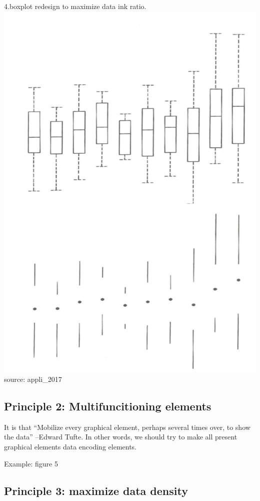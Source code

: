 \documentclass[]{book}
\theoremstyle{definition}
\theoremstyle{definition}
\theoremstyle{definition}
\theoremstyle{remark}
\begin{document}
4.boxplot redesign to maximize data ink ratio.
\includegraphics{images/Tufte_figure5.png} source: appli\_2017

\subsection{Principle 2: Multifuncitioning
elements}\label{principle-2-multifuncitioning-elements}

It is that ``Mobilize every graphical element, perhaps several times
over, to show the data'' --Edward Tufte. In other words, we should try
to make all present graphical elements data encoding elements.

Example: figure 5

\subsection{Principle 3: maximize data
density}\label{principle-3-maximize-data-density}
\end{document}
